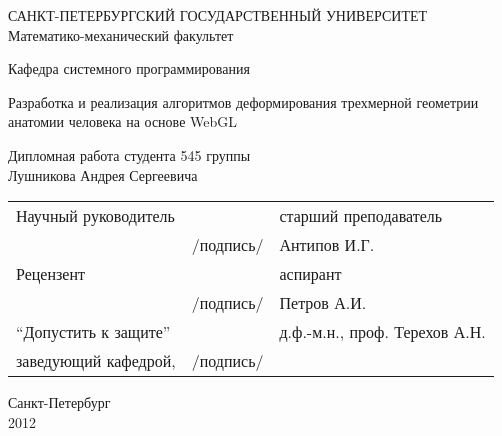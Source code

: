 \thispagestyle{empty}
\begin{center}
САНКТ-ПЕТЕРБУРГСКИЙ ГОСУДАРСТВЕННЫЙ УНИВЕРСИТЕТ\\
Математико-механический факультет\\
\end{center}
\begin{center}
Кафедра системного программирования\\
\end{center}
\vspace{2cm}
\begin{center}
    \Large{Разработка и реализация алгоритмов деформирования трехмерной геометрии
 анатомии человека на основе WebGL} \\
\end{center}
\vspace{1cm}
\begin{center}
    \normalsize{Дипломная работа студента 545 группы} \\
    \large{Лушникова Андрея Сергеевича}
\end{center}
\vspace{3cm}
\noindent
\begin{center}
    \small
    \begin{tabular}{lcl}
        Научный руководитель & \dotuline{\phantom{кошерная подпись}} & старший преподаватель\\
        & /подпись/ & Антипов И.Г.\\
        Рецензент & \dotuline{\phantom{кошерная подпись}} & аспирант \\
        & /подпись/& Петров А.И. \\
        ``Допустить к защите'' & \dotuline{\phantom{кошерная подпись}} & д.ф.-м.н., проф. Терехов А.Н. \\
        заведующий кафедрой, & /подпись/& \\
    \end{tabular}
\end{center}
\vspace{\fill}
\begin{center}
    \small
    Санкт-Петербург\\2012
\end{center}
\pagebreak
